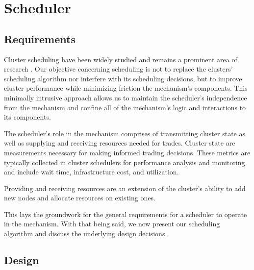 \section{Scheduler}
\subsection{Requirements}

Cluster scheduling have been widely studied and remains a prominent area of
research \cite{hindman_mesos_nodate, zaharia_delay_2010, patel_what_2022,
li_lyra_2023, qiao_pollux_nodate, schwarzkopf_omega_2013,
karanasos_mercury_2015, delgado_hawk_2015}. Our objective concerning scheduling
is not to replace the clusters' scheduling algorithm nor interfere with its
scheduling decisions, but to improve cluster performance while minimizing
friction the mechanism's components. This minimally intrusive approach allows
us to maintain the scheduler's independence from the mechanism and confine all
of the mechanism's logic and interactions to its components.

The scheduler's role in the mechanism comprises of transmitting cluster state
as well as supplying and receiving resources needed for trades. Cluster state are
measurements necessary for making informed trading decisions. These metrics are
typically collected in cluster schedulers for performance analysis and
monitoring and include wait time, infrastructure cost, and utilization.

\noindent Providing and receiving resources are an extension of the cluster's
ability to add new nodes and allocate resources on existing ones. 

This lays the groundwork for the general requirements for a scheduler to
operate in the mechanism. With that being said, we now present our scheduling
algorithm and discuss the underlying design decisions. 

\subsection{Design}

